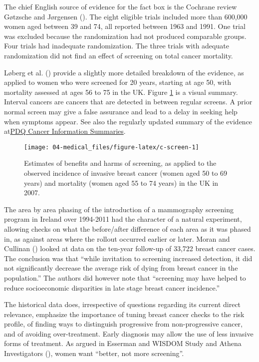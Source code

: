 \documentclass[
  10ptls,
  b5paper]{book}
\begin{document}
The chief English source of evidence for the fact box is the Cochrane review Gøtzsche and Jørgensen (). The eight eligible trials included more than 600,000 women aged between 39 and 74, all reported between 1963 and 1991. One trial was excluded because the randomization had not produced comparable groups. Four trials had inadequate randomization. The three trials with adequate randomization did not find an effect of screening on total cancer mortality.

Løberg et al. () provide a slightly more detailed breakdown of the evidence, as applied to women who were screened for 20 years, starting at age 50, with mortality assessed at ages 56 to 75 in the UK. Figure \ref{fig:c-screen} is a visual summary. Interval cancers are cancers that are detected in between regular screens. A prior normal screen may give a false assurance and lead to a delay in seeking help when symptoms appear. See also the regularly updated summary of the evidence at\href{https://www.ncbi.nlm.nih.gov/books/NBK65906/}{PDQ Cancer Information Summaries}.

\begin{figure}[H]

{\centering \texttt{[image: 04-medical\_files/figure-latex/c-screen-1]} 

}

\caption{Estimates of benefits and harms of screening, as applied to the observed incidence of invasive breast cancer (women aged 50 to 69 years) and mortality (women aged 55 to 74 years) in the UK in 2007.}\label{fig:c-screen}
\end{figure}

The area by area phasing of the introduction of a mammography screening program in Ireland over 1994-2011 had the character of a natural experiment, allowing checks on what the before/after difference of each area as it was phased in, as against areas where the rollout occurred earlier or later. Moran and Cullinan () looked at data on the ten-year follow-up of 33,722 breast cancer cases. The conclusion was that ``while invitation to screening increased detection, it did not significantly decrease the average risk of dying from breast cancer in the population.'' The authors did however note that ``screening may have helped to reduce socioeconomic disparities in late stage breast cancer incidence.''

The historical data does, irrespective of questions regarding its current direct relevance, emphasize the importance of tuning breast cancer checks to the risk profile, of finding ways to distinguish progressive from non-progressive cancer, and of avoiding over-treatment. Early diagnosis may allow the use of less invasive forms of treatment. As argued in Esserman and WISDOM Study and Athena Investigators (), women want ``better, not more screening''.
\end{document}
